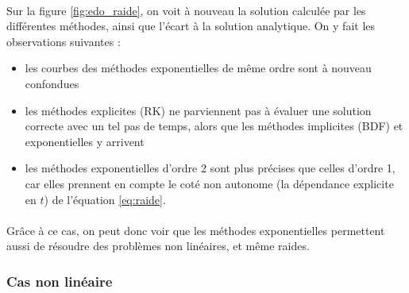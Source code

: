         \paragraph{}
        Sur la figure \ref{fig:edo_raide}, on voit à nouveau la solution calculée par les différentes méthodes, ainsi que l'écart à la solution analytique. On y fait les observations suivantes :
        \begin{itemize}
            \item les courbes des méthodes exponentielles de même ordre sont à nouveau confondues
            \item les méthodes explicites (RK) ne parviennent pas à évaluer une solution correcte avec un tel pas de temps, alors que les méthodes implicites (BDF) et exponentielles y arrivent
            \item les méthodes exponentielles d'ordre 2 sont plus précises que celles d'ordre 1, car elles prennent en compte le coté non autonome (la dépendance explicite en $t$) de l'équation \ref{eq:raide}.
        \end{itemize}

        \paragraph{}
        Grâce à ce cas, on peut donc voir que les méthodes exponentielles permettent aussi de résoudre des problèmes non linéaires, et même raides.

    \subsubsection{Cas non linéaire}
